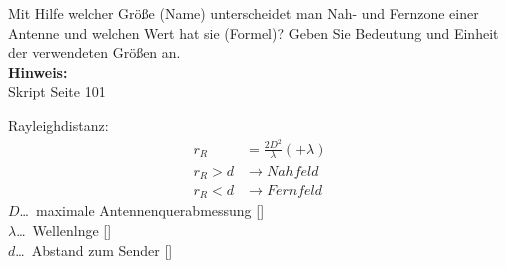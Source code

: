 \begin{question}[section=11,name={Rayleightdistanz},difficulty=,quantity=3,type=thr,tags={20151210,20130314}]
	Mit Hilfe welcher Größe (Name) unterscheidet man Nah- und Fernzone einer Antenne und welchen Wert hat sie (Formel)? Geben Sie Bedeutung und Einheit der verwendeten Größen an. 
	\\ \textbf{Hinweis:}\\
	Skript Seite 101
\end{question}
\begin{solution}
	Rayleighdistanz:
	\begin{align}
		r_R &= \frac{2D^2}{\lambda} (+\lambda)\\
	r_R > d &\rightarrow Nahfeld\\
	r_R < d &\rightarrow Fernfeld
\end{align}
	$D$\dots\ maximale Antennenquerabmessung [\metre]\\
	$\lambda$\dots\ Wellenlnge [\metre]\\
	$d$\dots\ Abstand zum Sender [\metre]
\end{solution}